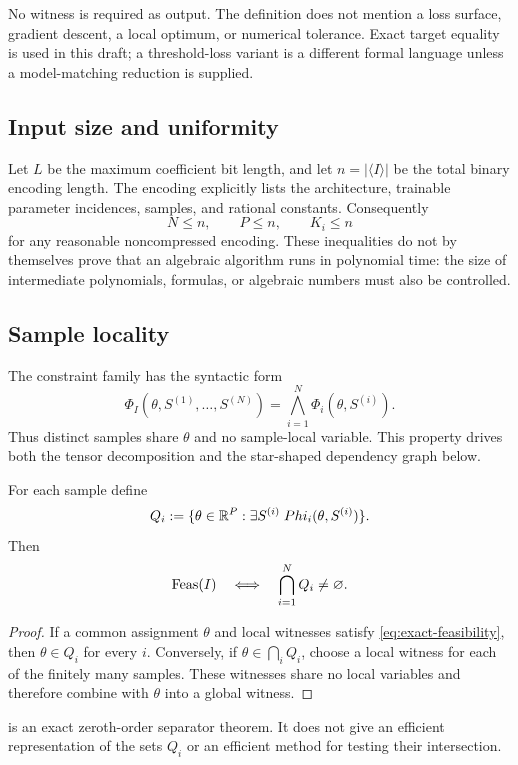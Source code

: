 No witness is required as output.  The definition does not mention a loss
surface, gradient descent, a local optimum, or numerical tolerance.  Exact
target equality is used in this draft; a threshold-loss variant is a different
formal language unless a model-matching reduction is supplied.

\subsection{Input size and uniformity}

Let \(L\) be the maximum coefficient bit length, and let \(n=|\langle
I\rangle|\) be the total binary encoding length.  The encoding explicitly
lists the architecture, trainable parameter incidences, samples, and rational
constants.  Consequently
\begin{equation}
  N\le n,\qquad P\le n,\qquad K_i\le n
  \label{eq:dimension-input-bounds}
\end{equation}
for any reasonable noncompressed encoding.  These inequalities do not by
themselves prove that an algebraic algorithm runs in polynomial time: the size
of intermediate polynomials, formulas, or algebraic numbers must also be
controlled.

\subsection{Sample locality}

The constraint family has the syntactic form
\begin{equation}
  \Phi_I(\theta,S^{(1)},\ldots,S^{(N)})
  =\bigwedge_{i=1}^{N}\Phi_i(\theta,S^{(i)}).
  \label{eq:sample-local-form}
\end{equation}
Thus distinct samples share \(\theta\) and no sample-local variable.  This
property drives both the tensor decomposition and the star-shaped dependency
graph below.

\begin{proposition}
\label{prop:semantic-projection}
For each sample define
\begin{equation}
  Q_i:=\{\theta\in\mathbb{R}^P:\exists S^{(i)}\;Phi_i(\theta,S^{(i)})\}.
  \label{eq:sample-projection}
\end{equation}
Then
\begin{equation}
  \operatorname{Feas}(I)\quad\Longleftrightarrow\quad
  \bigcap_{i=1}^{N}Q_i\ne\varnothing.
  \label{eq:projection-intersection}
\end{equation}
\end{proposition}

\begin{proof}
If a common assignment \(\theta\) and local witnesses satisfy
\cref{eq:exact-feasibility}, then \(\theta\in Q_i\) for every \(i\).  Conversely,
if \(\theta\in\bigcap_iQ_i\), choose a local witness for each of the finitely
many samples.  These witnesses share no local variables and therefore combine
with \(\theta\) into a global witness.
\end{proof}

 is an exact zeroth-order separator theorem.  It
does not give an efficient representation of the sets \(Q_i\) or an efficient
method for testing their intersection.
